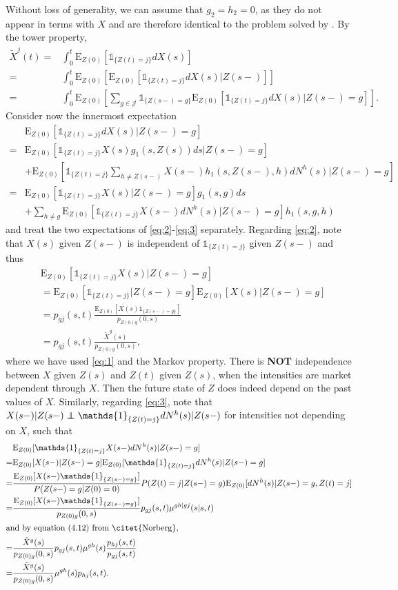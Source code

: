 \documentclass[12pt]{article}
\newcommand{\E}{\text{E}}
\newcommand{\indic}[1]{\mathds{1}_{ \{ #1 \} }}
\newcommand\independent{\protect\mathpalette{\protect\independenT}{\perp}}
\def\independenT#1#2{\mathrel{\rlap{$#1#2$}\mkern2mu{#1#2}}}
\begin{document}
Without loss of generality, we can assume that $g_2=h_2=0$, as they do not appear in terms with $X$ and are therefore identical to the problem solved by \citep{Norberg}.
By the tower property,
\begin{align*}
\tilde{X}^j(t)=& \int_0^t \E_{Z(0)}[\indic{Z(t)=j}dX(s)]
\\
=&
\int_0^t \E_{Z(0)}[ \E_{Z(0)}[ \indic{Z(t)=j} dX(s)|Z(s-)]]
\\
=&
\int_0^t \E_{Z(0)} \left[ \sum_{g \in \mathcal{J}} \indic{Z(s-)=g} \E_{Z(0)}[ \indic{Z(t)=j} dX(s)|Z(s-)=g ] \right].
\end{align*}
Consider now the innermost expectation
\begin{align}
&\E_{Z(0)}[ \indic{Z(t)=j} dX(s)|Z(s-)=g ] \nonumber \\
=&
\E_{Z(0)}[ \indic{Z(t)=j} X(s) g_1(s,Z(s))ds|Z(s-)=g] \nonumber
\\
&+ 
\E_{Z(0)} \left[ \indic{Z(t)=j} \sum_{h\neq Z(s-)}  X(s-)h_1(s,Z(s-),h) dN^h(s)|Z(s-)=g \right]\nonumber
\\
=&\E_{Z(0)}[ \indic{Z(t)=j} X(s)|Z(s-)=g]g_1(s,g) ds\label{eq:2}
\\
&+ 
\sum_{h\neq g} \E_{Z(0)}[ \indic{Z(t)=j}   X(s-) dN^h(s)|Z(s-)=g]h_1(s,g,h) \label{eq:3}
\end{align}
and treat the two expectations of \eqref{eq:2}-\eqref{eq:3} separately. Regarding \eqref{eq:2}, note that $X(s)$ given $Z(s-)$ is independent of $\indic{Z(t)=j}$ given $Z(s-)$ and thus
\begin{align}
&\E_{Z(0)}[\indic{Z(t)=j}X(s)|Z(s-)=g] \nonumber
\\
&=\E_{Z(0)}[\indic{Z(t)=j}|Z(s-)=g] \E_{Z(0)}[ X(s)|Z(s-)=g] \label{eq:AAA}
\\
&=p_{gj}(s,t) \frac{\E_{Z(0)}[X(s)\indic{Z(s-)=g}]}{p_{Z(0)g}(0,s)} \nonumber
\\
&=p_{gj}(s,t) \frac{\tilde{X}^g(s)}{p_{Z(0)g}(0,s)} \nonumber,
\end{align}
where we have used \eqref{eq:1} and the Markov property. There is \textbf{NOT} independence between $X$ given $Z(s)$ and $Z(t)$ given $Z(s)$, when the intensities are market dependent through $X$. Then the future state of $Z$ does indeed depend on the past values of $X$. Similarly, regarding \eqref{eq:3}, note that $X(s-)|Z(s-) \independent \indic{Z(t)=j}dN^h(s)|Z(s-	)$ for intensities not depending on $X$, such that 
\begin{align}
&\E_{Z(0)}[ \indic{Z(t)=j}   X(s-) dN^h(s)|Z(s-)=g] \nonumber
\\
=&  \E_{Z(0)}[ X(s-) |Z(s-)=g] \E_{Z(0)}[ \indic{Z(t)=j} dN^h(s)|Z(s-)=g] \label{eq:AAB}
\\
=&
\frac{\E_{Z(0)}[ X(s-) \indic{Z(s-)=g}]}{P(Z(s-)=g|Z(0)=0)}P(Z(t)=j|Z(s-)=g)\E_{Z(0)}[dN^h(s)|Z(s-)=g,Z(t)=j] \nonumber
\\
=&
\frac{\E_{Z(0)}[ X(s-) \indic{Z(s-)=g}]}{p_{Z(0)g}(0,s)}p_{gj}(s,t) \mu^{gh|gj}(s|s,t)\nonumber
\\
\intertext{and by equation (4.12) from \citet{Norberg},}
=&
\frac{\tilde{X}^g(s)}{p_{Z(0)g}(0,s)}p_{gj}(s,t) \mu^{gh}(s)\frac{p_{hj}(s,t)}{p_{gj}(s,t)} \nonumber
\\
=&
\frac{\tilde{X}^g(s)}{p_{Z(0)g}(0,s)} \mu^{gh}(s)p_{hj}(s,t). \nonumber
\end{align}
\end{document}
